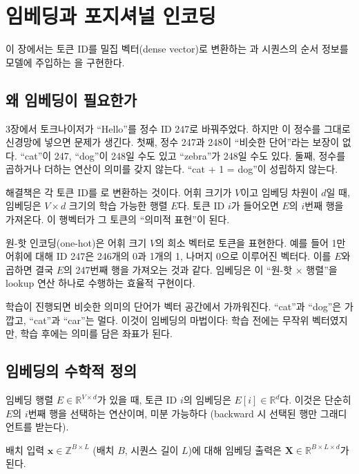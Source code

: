 \chapter{임베딩과 포지셔널 인코딩}
\label{ch:embedding}

이 장에서는 토큰 ID를 밀집 벡터(dense vector)로 변환하는 과 시퀀스의 순서 정보를 모델에 주입하는 을 구현한다.

\section{왜 임베딩이 필요한가}

3장에서 토크나이저가 ``Hello''를 정수 ID 247로 바꿔주었다. 하지만 이 정수를 그대로 신경망에 넣으면 문제가 생긴다. 첫째, 정수 247과 248이 ``비슷한 단어''라는 보장이 없다. ``cat''이 247, ``dog''이 248일 수도 있고 ``zebra''가 248일 수도 있다. 둘째, 정수를 곱하거나 더하는 연산이 의미를 갖지 않는다. ``cat + 1 = dog''이 성립하지 않는다.

해결책은 각 토큰 ID를 로 변환하는 것이다. 어휘 크기가 $V$이고 임베딩 차원이 $d$일 때, 임베딩은 $V \times d$ 크기의 학습 가능한 행렬 $E$다. 토큰 ID $i$가 들어오면 $E$의 $i$번째 행을 가져온다. 이 행벡터가 그 토큰의 ``의미적 표현''이 된다.

\begin{infobox}[왜 ``밀집''인가?]
원-핫 인코딩(one-hot)은 어휘 크기 $V$의 희소 벡터로 토큰을 표현한다. 예를 들어 1만 어휘에 대해 ID 247은 246개의 0과 1개의 1, 나머지 0으로 이루어진 벡터다. 이를 $E$와 곱하면 결국 $E$의 247번째 행을 가져오는 것과 같다. 임베딩은 이 ``원-핫 $\times$ 행렬''을 lookup 연산 하나로 수행하는 효율적 구현이다.

학습이 진행되면 비슷한 의미의 단어가 벡터 공간에서 가까워진다. ``cat''과 ``dog''은 가깝고, ``cat''과 ``car''는 멀다. 이것이 임베딩의 마법이다: 학습 전에는 무작위 벡터였지만, 학습 후에는 의미를 담은 좌표가 된다.
\end{infobox}

\section{임베딩의 수학적 정의}

임베딩 행렬 $E \in \mathbb{R}^{V \times d}$가 있을 때, 토큰 ID $i$의 임베딩은 $E[i] \in \mathbb{R}^d$다. 이것은 단순히 $E$의 $i$번째 행을 선택하는 연산이며, 미분 가능하다 (backward 시 선택된 행만 그래디언트를 받는다).

배치 입력 $\mathbf{x} \in \mathbb{Z}^{B \times L}$ (배치 $B$, 시퀀스 길이 $L$)에 대해 임베딩 출력은 $\mathbf{X} \in \mathbb{R}^{B \times L \times d}$가 된다.


